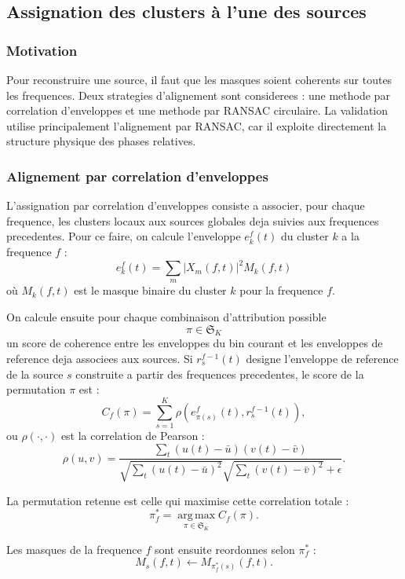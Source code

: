 \documentclass[11pt,a4paper]{article}
\newcommand{\argmax}{\operatorname*{arg\,max}}
\begin{document}
\subsection{Assignation des clusters à l'une des sources}

\subsubsection{Motivation}

Pour reconstruire une source, il faut que les masques soient coherents sur
toutes les frequences. Deux strategies d'alignement sont considerees : une
methode par correlation d'enveloppes et une methode par RANSAC circulaire. La
validation utilise principalement l'alignement par RANSAC, car il exploite
directement la structure physique des phases relatives.
\subsubsection{Alignement par correlation d'enveloppes}
L'assignation par correlation d'enveloppes consiste a associer, pour chaque
frequence, les clusters locaux aux sources globales deja suivies aux frequences
precedentes. Pour ce faire, on calcule l'enveloppe $e_k^f(t)$ du cluster $k$ a
la frequence $f$ :
\[
  e_k^f(t)
    =
    \sum_m |X_m(f,t)|^2 M_k(f,t)
\] 
où $M_k(f,t)$ est le masque binaire du cluster $k$ pour la frequence $f$.

On calcule ensuite pour chaque combinaison d'attribution possible 
\[
  \pi \in \mathfrak{S}_K
\]
un score de coherence entre les enveloppes du bin courant et les enveloppes de
reference deja associees aux sources. Si $r_s^{f-1}(t)$ designe l'enveloppe de
reference de la source $s$ construite a partir des frequences precedentes, le
score de la permutation $\pi$ est :
\[
  C_f(\pi)
    =
    \sum_{s=1}^{K}
    \rho\left(
      e_{\pi(s)}^f(t),
      r_s^{f-1}(t)
    \right),
\]
ou $\rho(\cdot,\cdot)$ est la correlation de Pearson :
\[
  \rho(u,v)
    =
    \frac{
      \sum_t
      \left(u(t)-\bar{u}\right)
      \left(v(t)-\bar{v}\right)
    }
    {
      \sqrt{\sum_t \left(u(t)-\bar{u}\right)^2}
      \sqrt{\sum_t \left(v(t)-\bar{v}\right)^2}
      +
      \epsilon
    }.
\]

La permutation retenue est celle qui maximise cette correlation totale :
\[
  \pi_f^{*}
    =
    \argmax_{\pi \in \mathfrak{S}_K}
    C_f(\pi).
\]

Les masques de la frequence $f$ sont ensuite reordonnes selon $\pi_f^{*}$ :
\[
  M_s(f,t)
    \leftarrow
    M_{\pi_f^{*}(s)}(f,t).
\]
\end{document}
